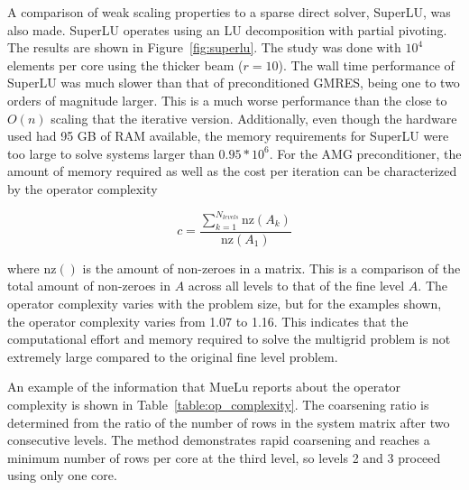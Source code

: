 A comparison of weak scaling properties to a sparse direct solver, SuperLU, was also made. SuperLU operates using an LU decomposition with partial pivoting. The results are shown in Figure~\ref{fig:superlu}. The study was done with $10^4$ elements per core using the thicker beam ($r=10$). The wall time performance of SuperLU was much slower than that of preconditioned GMRES, being one to two orders of magnitude larger. This is a much worse performance than the close to $O(n)$ scaling that the iterative version. Additionally, even though the hardware used had 95 GB of RAM available, the memory requirements for SuperLU were too large to solve systems larger than $0.95*10^6$. For the AMG preconditioner, the amount of memory required as well as the cost per iteration can be characterized by the operator complexity~\cite{Gee2009}

\begin{equation}
    c = \frac{\displaystyle \sum_{k=1}^{N_{levels}}{\text{nz}(A_k)}}{\text{nz}(A_1)}
\end{equation}

where nz$()$ is the amount of non-zeroes in a matrix. This is a comparison of the total amount of non-zeroes in $A$ across all levels to that of the fine level $A$. The operator complexity varies with the problem size, but for the examples shown, the operator complexity varies from 1.07 to 1.16. This indicates that the computational effort and memory required to solve the multigrid problem is not extremely large compared to the original fine level problem.

An example of the information that MueLu reports about the operator complexity is shown in Table~\ref{table:op_complexity}. The coarsening ratio is determined from the ratio of the number of rows in the system matrix after two consecutive levels. The method demonstrates rapid coarsening and reaches a minimum number of rows per core at the third level, so levels 2 and 3 proceed using only one core.

